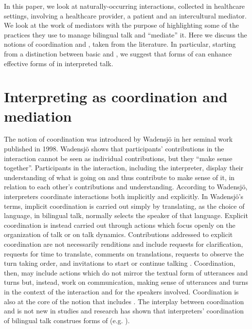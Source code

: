 \documentclass[output=paper]{LSP/langsci}
\begin{document}
\largerpage 
In this paper, we look at naturally-occurring interactions, collected in  healthcare settings, involving a healthcare provider, a patient and an intercultural mediator. We look at the work of mediators with the purpose of highlighting some of the practices they use to manage bilingual talk and ``mediate'' it.  Here we discuss the notions of coordination and , taken from the literature. In particular, starting from a distinction between basic and , we suggest that forms of  can enhance effective forms of   in interpreted talk. 

\section{Interpreting as coordination and mediation}
\largerpage
The notion of coordination was introduced by Wadensjö in her seminal work published in 1998. Wadensjö shows that participants' contributions in the interaction cannot be seen as individual contributions, but they ``make sense together''. Participants in the interaction, including the interpreter, display their understanding of what is going on and thus contribute to make sense of it, in relation to each other's contributions and understanding. According to Wadensjö, interpreters coordinate interactions both implicitly and explicitly. In Wadensjö's  terms, implicit coordination is carried out simply by translating, as the choice of language, in bilingual talk, normally selects the speaker of that language. Explicit coordination is instead carried out through actions which focus openly on the organization of talk or on talk dynamics. Contributions addressed to explicit coordination are not necessarily renditions and include requests for clarification, requests for time to translate, comments on translations, requests to observe the turn taking order, and invitations to start or continue talking \citep[108--110]{Wadensjo1998}. Coordination, then, may include actions which do not mirror the textual form of utterances and turns but, instead, work on communication, making sense of utterances and turns in the context of the interaction and for the speakers involved. Coordination is also at the core of the notion that  includes . The interplay between coordination and  is not new in  studies and research has shown that interpreters' coordination of bilingual talk construes forms of  (e.g. \citealt{Angelelli2004Medical, Angelelli2012, Penn2012, Pochhacker2008Interpreting, Wadensjo1998}).
\end{document}

